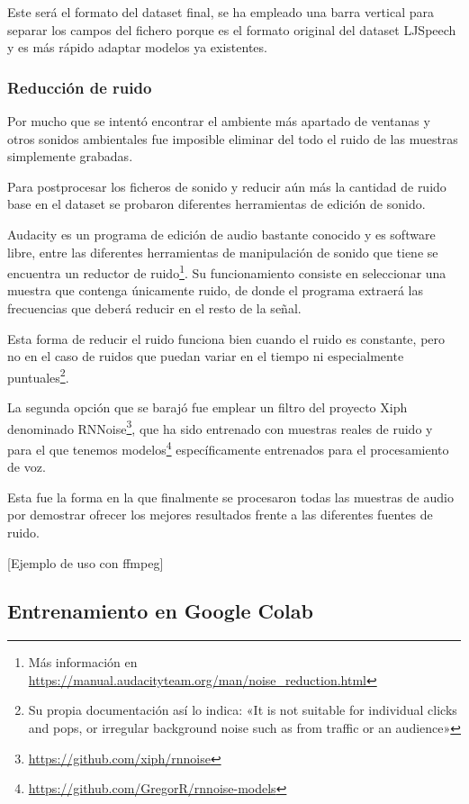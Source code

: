 Este será el formato del dataset final, se ha empleado una barra vertical para separar los campos del fichero porque es el formato original del dataset LJSpeech y es más rápido adaptar modelos ya existentes.

\subsubsection{Reducción de ruido}

Por mucho que se intentó encontrar el ambiente más apartado de ventanas y otros sonidos ambientales fue imposible eliminar del todo el ruido de las muestras simplemente grabadas. 

Para postprocesar los ficheros de sonido y reducir aún más la cantidad de ruido base en el dataset se probaron diferentes herramientas de edición de sonido.

Audacity es un programa de edición de audio bastante conocido y es software libre, entre las diferentes herramientas de manipulación de sonido que tiene se encuentra un reductor de ruido\footnote{Más información en \url{https://manual.audacityteam.org/man/noise_reduction.html}}. Su funcionamiento consiste en seleccionar una muestra que contenga únicamente ruido, de donde el programa extraerá las frecuencias que deberá reducir en el resto de la señal.

Esta forma de reducir el ruido funciona bien cuando el ruido es constante, pero no en el caso de ruidos que puedan variar en el tiempo ni especialmente puntuales\footnote{Su propia documentación así lo indica: «It is not suitable for individual clicks and pops, or irregular background noise such as from traffic or an audience»}.

La segunda opción que se barajó fue emplear un filtro del proyecto Xiph denominado RNNoise\footnote{\url{https://github.com/xiph/rnnoise}}, que ha sido entrenado con muestras reales de ruido y para el que tenemos modelos\footnote{\url{https://github.com/GregorR/rnnoise-models}} específicamente entrenados para el procesamiento de voz.

Esta fue la forma en la que finalmente se procesaron todas las muestras de audio por demostrar ofrecer los mejores resultados frente a las diferentes fuentes de ruido.

[Ejemplo de uso con ffmpeg]

\newpage 
\subsection{Entrenamiento en Google Colab}
\label{Entrenamiento en Google Colab}

